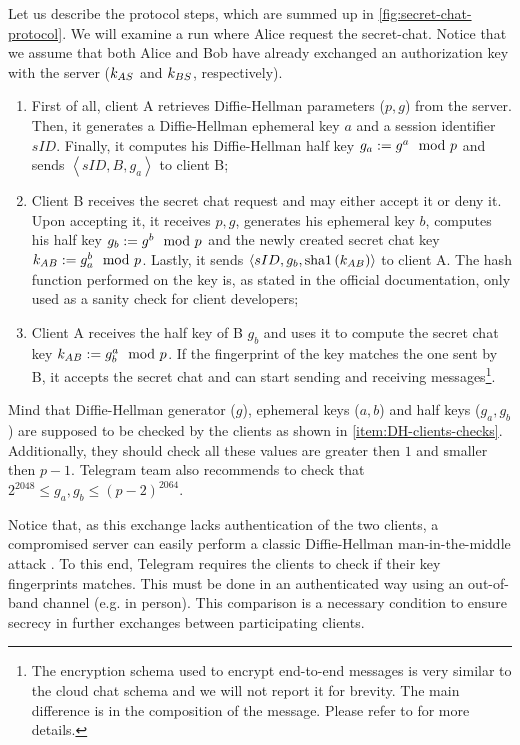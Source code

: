 Let us describe the protocol steps, which are summed up in \cref{fig:secret-chat-protocol}. We will examine a run where Alice request the secret-chat. Notice that we assume that both Alice and Bob have already exchanged an authorization key with the server ($k_{AS}$ and $k_{BS}$, respectively).

\begin{enumerate}
    \item{First of all, client A retrieves Diffie-Hellman parameters ($p, g$) from the server. Then, it generates a Diffie-Hellman ephemeral key $a$ and a session identifier $sID$. Finally, it computes his Diffie-Hellman half key $g_a:= g^a \mod{p}$ and sends $\left<sID, B, g_a\right>$ to client B;}
    \item{Client B receives the secret chat request and may either accept it or deny it. Upon accepting it, it receives $p, g$, generates his ephemeral key $b$, computes his half key $g_b:= g^b \mod{p}$ and the newly created secret chat key $k_{AB}:= g_a^b \mod{p}$. Lastly, it sends $\left<sID, g_b, \mbox{sha1}\left(k_{AB}\right)\right>$ to client A. The hash function performed on the key is, as stated in the official documentation, only used as a sanity check for client developers;}
    \item{Client A receives the half key of B $g_b$ and uses it to compute the secret chat key $k_{AB}:= g_b^a \mod{p}$. If the fingerprint of the key matches the one sent by B, it accepts the secret chat and can start sending and receiving messages\footnote{The encryption schema used to encrypt end-to-end messages is very similar to the cloud chat schema and we will not report it for brevity. The main difference is in the composition of the message. Please refer to \cite{Telegram-EndToEnd} for more details.}.}
\end{enumerate}

Mind that Diffie-Hellman generator ($g$), ephemeral keys ($a, b$) and half keys ($g_a, g_b$) are supposed to be checked by the clients as shown in \cref{item:DH-clients-checks}. Additionally, they should check all these values are greater then $1$ and smaller then $p-1$. Telegram team also recommends to check that $2^{2048}\leq g_a, g_b \leq \left(p-2\right)^{2064}$.

Notice that, as this exchange lacks authentication of the two clients, a compromised server can easily perform a classic Diffie-Hellman man-in-the-middle attack \cite{DH-MITM}. To this end, Telegram requires the clients to check if their key fingerprints matches. This must be done in an authenticated way using an out-of-band channel (e.g. in person). This comparison is a necessary condition to ensure secrecy in further exchanges between participating clients.

